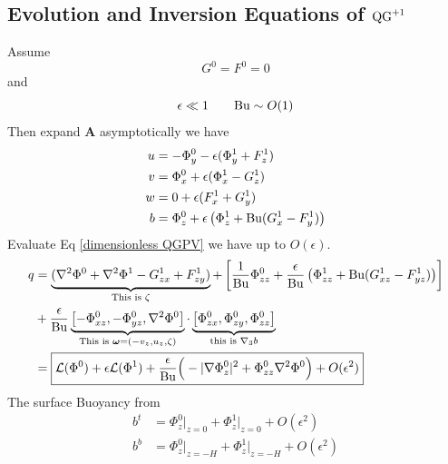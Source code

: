 \documentclass[../SQG_notes.tex]{subfiles}
\begin{document}
    \subsection{Evolution and Inversion Equations of \texorpdfstring{$\text{QG}^{+1}$}{QG1}}
    Assume 
    \[ G^0 = F^0 = 0\]
    and 
    \[ \epsilon \ll 1 \qquad \text{Bu} \sim O(1)\]
    Then expand $\bm{A}$ asymptotically we have 
    \begin{subequations}    
        \begin{align}
            u &= -\Phi_y^0 - \epsilon(\Phi_y^1 + F_z^1) \\
            v &= \Phi_x^0 + \epsilon(\Phi_x^1 - G_z^1) \\
            w &= 0 + \epsilon(F_x^1 + G_y^1) \\
            b &= \Phi_z^0 + \epsilon \left( \Phi_z^1 + \text{Bu}(G_x^1 - F_y^1)\right) \label{buoyancy in QG+1}
        \end{align}
    \end{subequations}
    Evaluate Eq \ref{dimensionless QGPV} we have up to $O(\epsilon)$. 
    \begin{align}
        q &= \underbrace{(\nabla^2\Phi^0 + \nabla^2\Phi^1 - G_{zx}^1 + F_{zy}^1)}_{\text{This is } \zeta} +\left[ \frac{1}{\text{Bu}}\Phi_{zz}^0 + \frac{\epsilon}{\text{Bu}}\left( \Phi_{zz}^1 + \text{Bu} (G_{xz}^1 - F_{yz}^1)\right) \right]\nonumber \\
        &+ \frac{\epsilon}{\text{Bu}} \underbrace{\left[-\Phi_{xz}^0, -\Phi_{yz}^0,\nabla^2\Phi^0\right]}_{\text{This is } \bm{\omega} = (-v_z, u_z, \zeta)} \cdot \underbrace{\left[\Phi_{zx}^0, \Phi_{zy}^0, \Phi_{zz}^0\right]}_{\text{this is } \nabla_3 b} \nonumber \\
        &= \boxed{\mathcal{L}(\Phi^0) + \epsilon \mathcal{L}(\Phi^1) +\frac{\epsilon}{\text{Bu}}\Big(-|\nabla\Phi_z^0|^2 + \Phi_{zz}^0\nabla^2\Phi^0\Big) + O(\epsilon^2)} \label{potential vorticity up to first order}
    \end{align}
    The surface Buoyancy from 
    \begin{subequations}
        \begin{align}
            b^t &= \Phi_z^0\Big|_{z = 0} + \Phi_z^1\Big|_{z = 0} + O(\epsilon^2) \\
            b^b &= \Phi_z^0\Big|_{z = -H} + \Phi_z^1\Big|_{z = -H} + O(\epsilon^2)  
        \end{align}
    \end{subequations}
\end{document}
